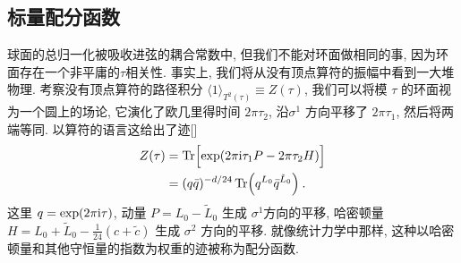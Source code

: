 \subsection*{标量配分函数}
球面的总归一化被吸收进弦的耦合常数中, 但我们不能对环面做相同的事, 因为环面存在一个非平庸的$\tau$相关性. 
事实上, 我们将从没有顶点算符的振幅中看到一大堆物理. 考察没有顶点算符的路径积分 $\langle 1\rangle_{T^{2}(\tau)} \equiv Z(\tau) $, 
我们可以将模 $\tau$ 的环面视为一个圆上的场论, 它演化了欧几里得时间 $2 \pi \tau_{2}$, 沿$\sigma^{1}$ 方向平移了 $2 \pi \tau_{1}$, 然后将两端等同. 
以算符的语言这给出了迹[]
\begin{align}
	Z(\tau) &=\operatorname{Tr}\Bigl[\exp (2 \pi \mathrm{i} \tau_{1} P-2 \pi \tau_{2} H)\Bigr] \nonumber \\
	&=(q \bar{q})^{-d / 24} \operatorname{Tr}\Bigl(q^{L_{0}} \bar{q}^{\tilde{L}_{0}}\Bigr) \:. \label{7.2.5}
\end{align}
这里 $q=\exp (2 \pi \mathrm{i} \tau)$, 动量 $P=L_{0}-\tilde{L}_{0}$ 生成 $\sigma^{1}$方向的平移, 
哈密顿量$H=L_{0}+\tilde{L}_{0}-\frac{1}{24}(c+\tilde{c})$ 生成 $\sigma^{2}$ 方向的平移. 
就像统计力学中那样, 这种以哈密顿量和其他守恒量的指数为权重的迹被称为配分函数.




